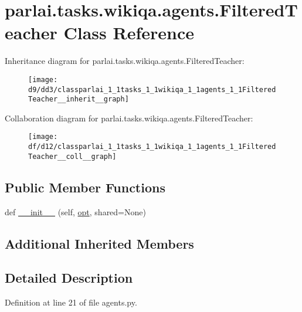 \hypertarget{classparlai_1_1tasks_1_1wikiqa_1_1agents_1_1FilteredTeacher}{}\section{parlai.\+tasks.\+wikiqa.\+agents.\+Filtered\+Teacher Class Reference}
\label{classparlai_1_1tasks_1_1wikiqa_1_1agents_1_1FilteredTeacher}


Inheritance diagram for parlai.\+tasks.\+wikiqa.\+agents.\+Filtered\+Teacher\+:
\nopagebreak
\begin{figure}[H]
\begin{center}
\leavevmode
\texttt{[image: d9/dd3/classparlai\_1\_1tasks\_1\_1wikiqa\_1\_1agents\_1\_1FilteredTeacher\_\_inherit\_\_graph]}
\end{center}
\end{figure}


Collaboration diagram for parlai.\+tasks.\+wikiqa.\+agents.\+Filtered\+Teacher\+:
\nopagebreak
\begin{figure}[H]
\begin{center}
\leavevmode
\texttt{[image: df/d12/classparlai\_1\_1tasks\_1\_1wikiqa\_1\_1agents\_1\_1FilteredTeacher\_\_coll\_\_graph]}
\end{center}
\end{figure}
\subsection*{Public Member Functions}
\begin{DoxyCompactItemize}
\item 
def \hyperlink{classparlai_1_1tasks_1_1wikiqa_1_1agents_1_1FilteredTeacher_a35563cba37e255a02ee062216736c690}{\+\_\+\+\_\+init\+\_\+\+\_\+} (self, \hyperlink{classparlai_1_1core_1_1teachers_1_1FbDialogTeacher_af7a9ec497b9cd0292d7b8fa220da7c28}{opt}, shared=None)
\end{DoxyCompactItemize}
\subsection*{Additional Inherited Members}


\subsection{Detailed Description}


Definition at line 21 of file agents.\+py.



